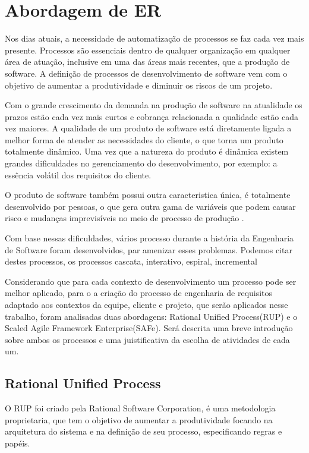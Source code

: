 \chapter[Abordagem de ER]{Abordagem de ER}\label{cap3}

Nos dias atuais, a necessidade de automatização de processos se faz cada vez mais
presente. Processos são essenciais dentro de qualquer organização em qualquer área
de atuação, inclusive em uma das áreas mais recentes, que a produção de software.
A definição de processos de desenvolvimento de software vem com o objetivo de aumentar
a produtividade e diminuir os riscos de um projeto\cite{VIEIRA}.

Com o grande crescimento da demanda na produção de software
na atualidade os prazos estão cada vez mais curtos e cobrança relacionada a qualidade
estão cada vez maiores. A qualidade de um produto de software está diretamente ligada
a melhor forma de atender as necessidades do cliente, o que torna um produto totalmente dinâmico.
Uma vez que a natureza do produto é dinâmica existem grandes dificuldades no gerenciamento
do desenvolvimento, por exemplo: a essência volátil dos requisitos do cliente\cite{TAVARES}.

O produto de software também possui outra caracteristica única, é totalmente desenvolvido
por pessoas, o que gera outra gama de variáveis que podem causar risco e mudanças
imprevisíveis no meio de processo de produção \cite{SCHWABER}.

Com base nessas dificuldades, vários processo durante a história da Engenharia de
Software foram desenvolvidos, par amenizar esses problemas. Podemos citar destes
processos, os processos cascata, interativo, espiral, incremental

Considerando que para cada contexto de desenvolvimento um processo pode ser melhor
aplicado, para o a criação do processo de engenharia de requisitos adaptado aos
contextos da equipe, cliente e projeto, que serão aplicados nesse trabalho, foram
analisadas duas abordagens: Rational Unified Process(RUP) e o Scaled Agile Framework
Enterprise(SAFe). Será descrita uma breve introdução sobre ambos os processos e uma
juistificativa da escolha de atividades de cada um.

\section{Rational Unified Process}

O RUP foi criado pela Rational Software Corporation, é uma metodologia proprietaria,
que tem o objetivo de aumentar a produtividade focando na arquitetura do sistema
e na definição de seu processo, especificando regras e papéis\cite{IBM}.

